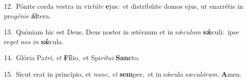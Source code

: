 {\numbfont\textcolor{\numbcolor}{12.}}~Pónite corda vestra in vir\-\textit{tú}\-\textit{te} \textbf{e}\-jus:~\star et distribúite domos ejus, ut enarrétis in pro\-\textit{gé}\-\textit{ni}\textit{e} \textbf{ál}\-tera.\par
{\numbfont\textcolor{\numbcolor}{13.}}~Quóniam hic est Deus, Deus noster in ætérnum et in sǽ\-\textit{cu}\-\textit{lum} \textbf{sǽ}\-culi:~\star ipse re\textit{get} \textit{nos} \textit{in} \textbf{sǽ}\-cula.\par
{\numbfont\textcolor{\numbcolor}{14.}}~Glória Pa\-\textit{tri}\-, \textit{et} \textbf{Fí}\-lio,~\star et Spi\-\textit{rí}\-\textit{tu}\textit{i} \textbf{Sanc}\-to.\par
{\numbfont\textcolor{\numbcolor}{15.}}~Sicut erat in princípio, et \textit{nunc}\-, \textit{et} \textbf{sem}\-per,~\star et in sǽcula sæ\-\textit{cu}\-\textit{ló}\textit{rum}. \textbf{A}\-men.\par
